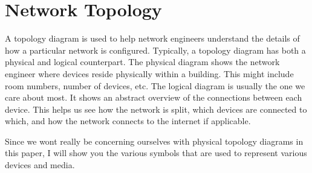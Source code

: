 \documentclass{article}
\begin{document}
\section{Network Topology}

A topology diagram is used to help network engineers understand the details of how a particular network is
configured. Typically, a topology diagram has both a physical and logical counterpart. The physical diagram
shows the network engineer where devices reside physically within a building. This might include room numbers,
number of devices, etc. The logical diagram is usually the one we care about most. It shows an abstract
overview of the connections between each device. This helps us see how the network is split, which devices are
connected to which, and how the network connects to the internet if applicable.

Since we wont really be concerning ourselves with physical topology diagrams in this paper, I will show you the
various symbols that are used to represent various devices and media.
\end{document}

